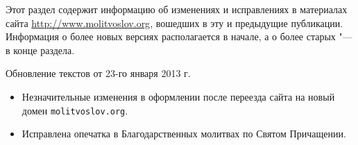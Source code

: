 \renewcommand{\ornament}{uzor_begin_9}

Этот раздел содержит информацию об изменениях и исправлениях в материалах сайта \url{http://www.molitvoslov.org}, вошедших в эту и предыдущие публикации. Информация о более новых версиях располагается в начале, а о более старых "--- в конце раздела.


{\small Обновление текстов от 23-го января 2013 г.

\begin{itemize}

\item Незначительные изменения в оформлении после переезда сайта на новый домен \texttt{molitvoslov.org}.
\item Исправлена опечатка в Благодарственных молитвах по Святом Причащении.

\end{itemize}}


